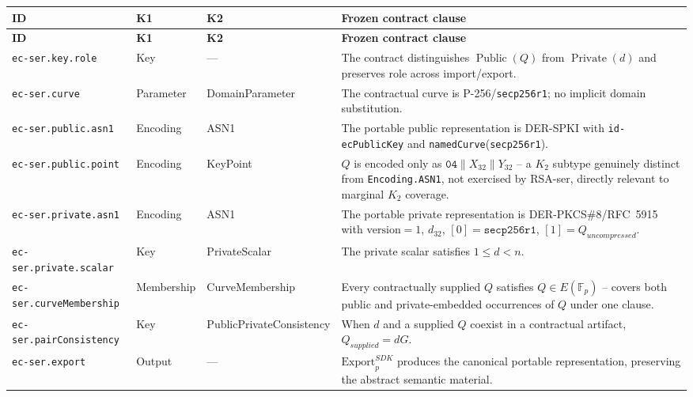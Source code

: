 \documentclass[11pt,a4paper]{article}
\begin{document}
\begin{longtable}{p{}p{}p{}p{}}
\toprule
\textbf{ID} & \textbf{K1} & \textbf{K2} & \textbf{Frozen contract clause}\\
\midrule
\endfirsthead
\toprule
\textbf{ID} & \textbf{K1} & \textbf{K2} & \textbf{Frozen contract clause}\\
\midrule
\endhead

\texttt{ec-ser.key.role} &
Key &
--- &
The contract distinguishes $\operatorname{Public}(Q)$ from $\operatorname{Private}(d)$ and preserves role across import/export.\\

\texttt{ec-ser.curve} &
Parameter &
DomainParameter &
The contractual curve is P-256/\texttt{secp256r1}; no implicit domain substitution.\\

\texttt{ec-ser.public.asn1} &
Encoding &
ASN1 &
The portable public representation is DER-SPKI with \texttt{id-ecPublicKey} and \texttt{namedCurve}(\texttt{secp256r1}).\\

\texttt{ec-ser.public.point} &
Encoding &
KeyPoint &
$Q$ is encoded only as $\texttt{04}\|X_{32}\|Y_{32}$ -- a $K_2$ subtype genuinely distinct from \texttt{Encoding.ASN1}, not exercised by RSA-ser, directly relevant to marginal $K_2$ coverage.\\

\texttt{ec-ser.private.asn1} &
Encoding &
ASN1 &
The portable private representation is DER-PKCS\#8/RFC~5915 with $\text{version}=1$, $d_{32}$, $[0]=\texttt{secp256r1}$, $[1]=Q_{uncompressed}$.\\

\texttt{ec-ser.private.scalar} &
Key &
PrivateScalar &
The private scalar satisfies $1\le d<n$.\\

\texttt{ec-ser.curveMembership} &
Membership &
CurveMembership &
Every contractually supplied $Q$ satisfies $Q\in E(\mathbb{F}_p)$ -- covers both public and private-embedded occurrences of $Q$ under one clause.\\

\texttt{ec-ser.pairConsistency} &
Key &
PublicPrivateConsistency &
When $d$ and a supplied $Q$ coexist in a contractual artifact, $Q_{supplied}=dG$.\\

\texttt{ec-ser.export} &
Output &
--- &
$\text{Export}_p^{SDK}$ produces the canonical portable representation, preserving the abstract semantic material.\\


\end{longtable}
\end{document}
